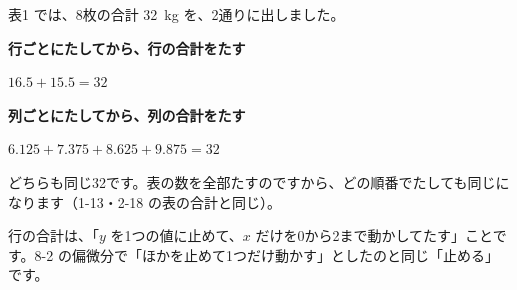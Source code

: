 

\label{bk:8-6:gyouretsu}表1 では、8枚の合計 \qty{32}{kg} を、2通りに出しました。
\begin{enumerate}[label={\bkcircled[\bkTT]{\arabic*}}, leftmargin=2.4\zw, itemsep=2pt, topsep=2pt]
\item \textbf{行ごとにたしてから、行の合計をたす}\par\nobreak\noindent $16.5+15.5=32$
\item \textbf{列ごとにたしてから、列の合計をたす}\par\nobreak\noindent $6.125+7.375+8.625+9.875=32$
\end{enumerate}
どちらも同じ32です。表の数を全部たすのですから、どの順番でたしても同じになります（1-13・2-18 の表の合計と同じ）。




行の合計は、「$y$ を1つの値に止めて、$x$ だけを0から2まで動かしてたす」ことです。8-2 の偏微分で「ほかを止めて1つだけ動かす」としたのと同じ「止める」です。

